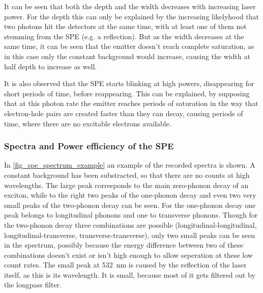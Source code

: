 It can be seen that both the depth and the width decreases with increasing laser power.
For the depth this can only be explained by the increasing likelyhood that two photons hit the detectors at the same time, with at least one of them not stemming from the SPE (e.g. a reflection).
But as the width decreases at the same time, it can be seen that the emitter doesn't reach complete saturation, as in this case only the constant background would increase, causing the width at half depth to increase as well.

It is also observed that the SPE starts blinking at high powers, disappearing for short periods of time, before reappearing.
This can be explained, by supposing that at this photon rate the emitter reaches periods of saturation in the way that electron-hole pairs are created faster than they can decay, causing periods of time, where there are no excitable electrons available.

\subsubsection{Spectra and Power efficiency of the SPE}

In \cref{fig_spe_spectrum_example} an example of the recorded spectra is shown.
A constant background has been substracted, so that there are no counts at high wavelengths.
The large peak corresponds to the main zero-phonon decay of an exciton, while to the right two peaks of the one-phonon decay and even two very small peaks of the two-phonon decay can be seen.
For the one-phonon decay one peak belongs to longitudinal phonons and one to transverse phonons.
Though for the two-phonon decay three combinations are possible (longitudinal-longitudinal, longitudinal-transverse, transverse-transverse), only two small peaks can be seen in the spectrum, possibly because the energy difference between two of these combinations doesn't exist or isn't high enough to allow seperation at these low count rates.
The small peak at \SI{532}{nm} is caused by the reflection of the laser itself, as this is its wavelength.
It is small, because most of it gets filtered out by the longpass filter.

